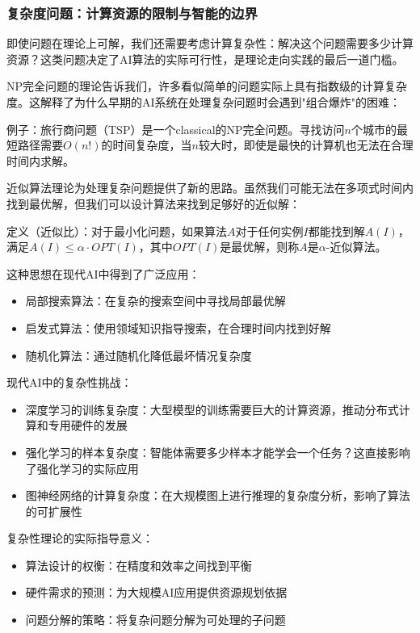 \subsubsection{复杂度问题：计算资源的限制与智能的边界}

即使问题在理论上可解，我们还需要考虑计算复杂性：解决这个问题需要多少计算资源？这类问题决定了AI算法的实际可行性，是理论走向实践的最后一道门槛。

NP完全问题的理论告诉我们，许多看似简单的问题实际上具有指数级的计算复杂度。这解释了为什么早期的AI系统在处理复杂问题时会遇到"组合爆炸"的困难：

例子：旅行商问题（TSP）是一个classical的NP完全问题。寻找访问$n$个城市的最短路径需要$O(n!)$的时间复杂度，当$n$较大时，即使是最快的计算机也无法在合理时间内求解。

近似算法理论为处理复杂问题提供了新的思路。虽然我们可能无法在多项式时间内找到最优解，但我们可以设计算法来找到足够好的近似解：

定义（近似比）：对于最小化问题，如果算法$A$对于任何实例$I$都能找到解$A(I)$，满足$A(I) \leq \alpha \cdot OPT(I)$，其中$OPT(I)$是最优解，则称$A$是$\alpha$-近似算法。

这种思想在现代AI中得到了广泛应用：

\begin{itemize}
\item 局部搜索算法：在复杂的搜索空间中寻找局部最优解
\item 启发式算法：使用领域知识指导搜索，在合理时间内找到好解
\item 随机化算法：通过随机化降低最坏情况复杂度
\end{itemize}

现代AI中的复杂性挑战：

\begin{itemize}
\item 深度学习的训练复杂度：大型模型的训练需要巨大的计算资源，推动分布式计算和专用硬件的发展
\item 强化学习的样本复杂度：智能体需要多少样本才能学会一个任务？这直接影响了强化学习的实际应用
\item 图神经网络的计算复杂度：在大规模图上进行推理的复杂度分析，影响了算法的可扩展性
\end{itemize}

复杂性理论的实际指导意义：

\begin{itemize}
\item 算法设计的权衡：在精度和效率之间找到平衡
\item 硬件需求的预测：为大规模AI应用提供资源规划依据  
\item 问题分解的策略：将复杂问题分解为可处理的子问题
\end{itemize}

